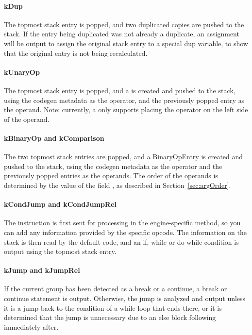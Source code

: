 \paragraph{kDup}
The topmost stack entry is popped, and two duplicated copies are pushed to the stack. If the entry being duplicated was not already a duplicate, an assignment will be output to assign the original stack entry to a special dup variable, to show that the original entry is not being recalculated.

\paragraph{kUnaryOp}
The topmost stack entry is popped, and a  is created and pushed to the stack, using the codegen metadata as the operator, and the previously popped entry as the operand. Note: currently, a  only supports placing the operator on the left side of the operand.

\paragraph{kBinaryOp and kComparison}
The two topmost stack entries are popped, and a BinaryOpEntry is created and pushed to the stack, using the codegen metadata as the operator and the previously popped entries as the operands. The order of the operands is determined by the value of the field , as described in Section~\vref{sec:argOrder}.

\paragraph{kCondJump and kCondJumpRel}
The instruction is first sent for processing in the engine-specific  method, so you can add any information provided by the specific opcode. The information on the stack is then read by the default code, and an if, while or do-while condition is output using the topmost stack entry.

\paragraph{kJump and kJumpRel}
If the current group has been detected as a break or a continue, a break or continue statement is output. Otherwise, the jump is analyzed and output unless it is a jump back to the condition of a while-loop that ends there, or it is determined that the jump is unnecessary due to an else block following immediately after.

